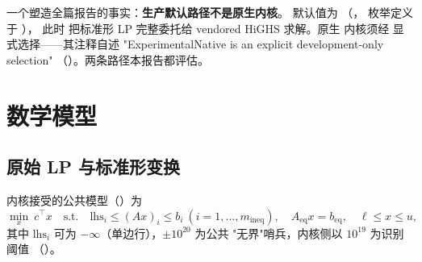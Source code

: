 \documentclass[11pt]{ctexart}
\begin{document}
一个塑造全篇报告的事实：\textbf{生产默认路径不是原生内核}。
 默认值为
（，
枚举定义于 ），
此时  把标准形 LP 完整委托给 vendored
HiGHS 求解。原生  内核须经
 显式选择——其注释自述
"ExperimentalNative is an explicit development-only selection"
（）。两条路径本报告都评估。

\section{数学模型}
\label{sec:math}

\subsection{原始 LP 与标准形变换}
\label{sec:stdform}
内核接受的公共模型（）为
\begin{equation}
\min_{x}\ c^{\top}x \quad
\text{s.t.}\quad \mathrm{lhs}_i \le (A x)_i \le b_i\ (i=1,\dots,m_{\mathrm{ineq}}),\quad
A_{\mathrm{eq}} x = b_{\mathrm{eq}},\quad
\ell \le x \le u,
\label{eq:orig}
\end{equation}
其中 $\mathrm{lhs}_i$ 可为 $-\infty$（单边行），$\pm 10^{20}$ 为公共
"无界"哨兵，内核侧以 $10^{19}$ 为识别阈值
（）。
\end{document}
